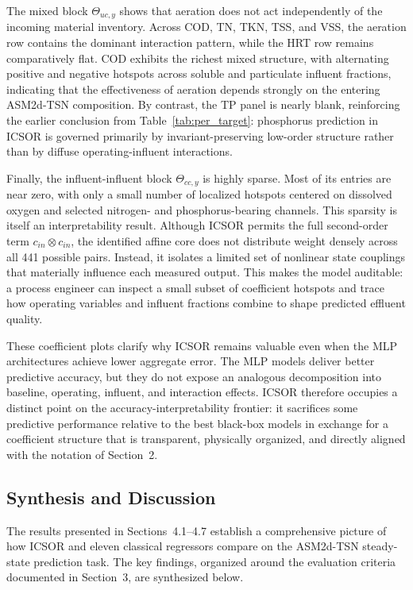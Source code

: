 \documentclass[11pt]{article}
\begin{document}
The mixed block $\Theta_{uc,y}$ shows that aeration does not act independently of the incoming material inventory. Across COD, TN, TKN, TSS, and VSS, the aeration row contains the dominant interaction pattern, while the HRT row remains comparatively flat. COD exhibits the richest mixed structure, with alternating positive and negative hotspots across soluble and particulate influent fractions, indicating that the effectiveness of aeration depends strongly on the entering ASM2d-TSN composition. By contrast, the TP panel is nearly blank, reinforcing the earlier conclusion from Table~\ref{tab:per_target}: phosphorus prediction in ICSOR is governed primarily by invariant-preserving low-order structure rather than by diffuse operating-influent interactions.

Finally, the influent-influent block $\Theta_{cc,y}$ is highly sparse. Most of its entries are near zero, with only a small number of localized hotspots centered on dissolved oxygen and selected nitrogen- and phosphorus-bearing channels. This sparsity is itself an interpretability result. Although ICSOR permits the full second-order term $c_{in} \otimes c_{in}$, the identified affine core does not distribute weight densely across all 441 possible pairs. Instead, it isolates a limited set of nonlinear state couplings that materially influence each measured output. This makes the model auditable: a process engineer can inspect a small subset of coefficient hotspots and trace how operating variables and influent fractions combine to shape predicted effluent quality.

These coefficient plots clarify why ICSOR remains valuable even when the MLP architectures achieve lower aggregate error. The MLP models deliver better predictive accuracy, but they do not expose an analogous decomposition into baseline, operating, influent, and interaction effects. ICSOR therefore occupies a distinct point on the accuracy-interpretability frontier: it sacrifices some predictive performance relative to the best black-box models in exchange for a coefficient structure that is transparent, physically organized, and directly aligned with the notation of Section~2.

\subsection{Synthesis and Discussion}

The results presented in Sections~4.1--4.7 establish a comprehensive picture of how ICSOR and eleven classical regressors compare on the ASM2d-TSN steady-state prediction task. The key findings, organized around the evaluation criteria documented in Section~3, are synthesized below.
\end{document}
